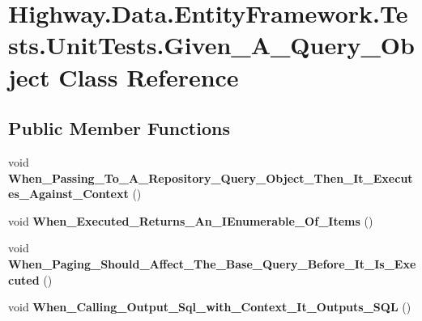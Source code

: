 \hypertarget{class_highway_1_1_data_1_1_entity_framework_1_1_tests_1_1_unit_tests_1_1_given___a___query___object}{\section{Highway.\-Data.\-Entity\-Framework.\-Tests.\-Unit\-Tests.\-Given\-\_\-\-A\-\_\-\-Query\-\_\-\-Object Class Reference}
\label{class_highway_1_1_data_1_1_entity_framework_1_1_tests_1_1_unit_tests_1_1_given___a___query___object}
}
\subsection*{Public Member Functions}
\begin{DoxyCompactItemize}
\item 
\hypertarget{class_highway_1_1_data_1_1_entity_framework_1_1_tests_1_1_unit_tests_1_1_given___a___query___object_abc0fbd42e6d418f22c24d08d78b65bbe}{void {\bfseries When\-\_\-\-Passing\-\_\-\-To\-\_\-\-A\-\_\-\-Repository\-\_\-\-Query\-\_\-\-Object\-\_\-\-Then\-\_\-\-It\-\_\-\-Executes\-\_\-\-Against\-\_\-\-Context} ()}\label{class_highway_1_1_data_1_1_entity_framework_1_1_tests_1_1_unit_tests_1_1_given___a___query___object_abc0fbd42e6d418f22c24d08d78b65bbe}

\item 
\hypertarget{class_highway_1_1_data_1_1_entity_framework_1_1_tests_1_1_unit_tests_1_1_given___a___query___object_a531fe0502ad3aed485e7c313eb30cbde}{void {\bfseries When\-\_\-\-Executed\-\_\-\-Returns\-\_\-\-An\-\_\-\-I\-Enumerable\-\_\-\-Of\-\_\-\-Items} ()}\label{class_highway_1_1_data_1_1_entity_framework_1_1_tests_1_1_unit_tests_1_1_given___a___query___object_a531fe0502ad3aed485e7c313eb30cbde}

\item 
\hypertarget{class_highway_1_1_data_1_1_entity_framework_1_1_tests_1_1_unit_tests_1_1_given___a___query___object_ad9922acfb416e5150420508ddf864bb2}{void {\bfseries When\-\_\-\-Paging\-\_\-\-Should\-\_\-\-Affect\-\_\-\-The\-\_\-\-Base\-\_\-\-Query\-\_\-\-Before\-\_\-\-It\-\_\-\-Is\-\_\-\-Executed} ()}\label{class_highway_1_1_data_1_1_entity_framework_1_1_tests_1_1_unit_tests_1_1_given___a___query___object_ad9922acfb416e5150420508ddf864bb2}

\item 
\hypertarget{class_highway_1_1_data_1_1_entity_framework_1_1_tests_1_1_unit_tests_1_1_given___a___query___object_ab57f6d1dfcd9ad481b5e7cec10e5688d}{void {\bfseries When\-\_\-\-Calling\-\_\-\-Output\-\_\-\-Sql\-\_\-with\-\_\-\-Context\-\_\-\-It\-\_\-\-Outputs\-\_\-\-S\-Q\-L} ()}\label{class_highway_1_1_data_1_1_entity_framework_1_1_tests_1_1_unit_tests_1_1_given___a___query___object_ab57f6d1dfcd9ad481b5e7cec10e5688d}

\end{DoxyCompactItemize}
